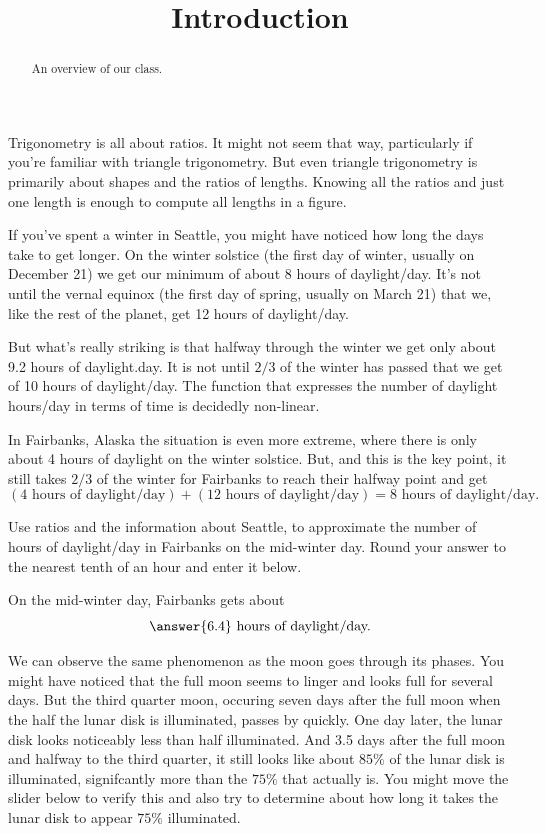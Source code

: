 \documentclass{ximera}
\title{Introduction}
\begin{document}
\begin{abstract}
An overview of our class.
\end{abstract}
\maketitle

Trigonometry is all about ratios. It might not seem that way, particularly if you're familiar with triangle trigonometry. But even triangle trigonometry is primarily about shapes and the ratios of lengths. Knowing all the ratios and just one length is enough to compute all lengths in a figure.

If you've spent a winter in Seattle, you might have noticed how long the days take to get longer. On the winter solstice (the first day of winter, usually on December 21) we get our minimum of about 8 hours of daylight/day. It's not until the vernal equinox
(the first day of spring, usually on March 21) that we, like the rest of the planet, get 12 hours of daylight/day.

But what's really striking is that halfway through the winter we get only about 9.2 hours of daylight.day. It is not until $2/3$ of the winter has passed that we get of 10 hours of daylight/day. The function that expresses the number of daylight hours/day in terms of time is decidedly non-linear.

In Fairbanks, Alaska the situation is even more extreme, where there is only about 4 hours of daylight on the winter solstice. But, and this is the key point, it still takes $2/3$ of the winter for Fairbanks to reach their halfway point and get
\[
  ( 4 \text{ hours of daylight/day}) + ( 12 \text{ hours of daylight/day}) =  8 \text{ hours of daylight/day}.
\]  

\begin{question} \label{Q1:Introduction}
Use ratios and the information about Seattle, to approximate the number of hours of daylight/day in Fairbanks on the mid-winter day. Round your answer to the nearest tenth of an hour and enter it below.

On the mid-winter day, Fairbanks gets about 
\[
    \answer{6.4} \text{ hours of daylight/day.}
\]
\end{question}

We can observe the same phenomenon as the moon goes through its phases. You might have noticed that the full moon seems to linger and looks full for several days. But the third quarter moon, occuring seven days after the full moon when the half the lunar disk is illuminated, passes by quickly. One day later, the lunar disk looks noticeably less than half illuminated. And 3.5 days after the full moon and halfway to the third quarter, it still looks like about $85\%$ of the lunar disk is illuminated, signifcantly more than the $75\%$ that actually is. You might move the slider below to verify this and also try to  determine about how long it takes the lunar disk to appear $75\%$ illuminated.
\end{document}
